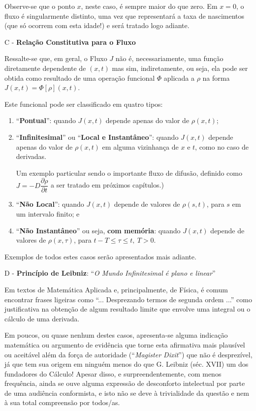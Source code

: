 {Observe-se que o ponto \(x\), neste caso, é sempre maior do que zero. Em \(x = 0\), o fluxo é singularmente distinto, uma vez que representará a taxa de nascimentos (que só ocorrem com esta idade!) e será tratado logo adiante.

C - \textbf{Relação Constitutiva para o Fluxo}

Ressalte-se que, em geral, o Fluxo \(J\) não é, necessariamente, uma função diretamente dependente de \((x,t)\) mas sim, indiretamente, ou seja, ela pode ser obtida como resultado de uma operação funcional \(\Phi\) aplicada a \(\rho\) na forma \(J(x,t) = \Phi[\rho](x,t)\).

Este funcional pode ser classificado em quatro tipos:

\begin{enumerate}
\item ``\textbf{Pontual}'': quando \(J(x,t)\) depende apenas do valor de \(\rho(x,t)\);
\item ``\textbf{Infinitesimal}'' ou ``\textbf{Local e Instantâneo}'': quando \(J(x,t)\) depende apenas do valor de \(\rho(x,t)\) em alguma vizinhança de \(x\) e \(t\), como no caso de derivadas.

Um exemplo particular sendo o importante fluxo de difusão, definido como \(J = -D \dfrac{\partial \rho}{\partial t}\) a ser tratado em próximos capítulos.)

\item ``\textbf{Não Local}'': quando \(J(x,t)\) depende de valores de \(\rho(s,t)\), para \(s\) em um intervalo finito; e
\item ``\textbf{Não Instantâneo}'' ou seja, \textbf{com memória}: quando \(J(x,t)\) depende de valores de \(\rho(x,\tau)\), para \(t - T \le \tau \le t,\ T > 0\).
\end{enumerate}


Exemplos de todos estes casos serão apresentados mais adiante.

D - \textbf{Princípio de Leibniz}: ``\textit{O Mundo Infinitesimal é plano e linear}''

Em textos de Matemática Aplicada e, principalmente, de Física, é comum encontrar frases ligeiras como ``... Desprezando termos de segunda ordem ...'' como justificativa na obtenção de algum resultado limite que envolve uma integral ou o cálculo de uma derivada.

Em poucos, ou quase nenhum destes casos, apresenta-se alguma indicação matemática ou argumento de evidência que torne esta afirmativa mais plausível ou aceitável além da força de autoridade (``\textit{Magister Dixit}'') que não é desprezível, já que tem sua origem em ninguém menos do que G. Leibniz (séc. XVII) um dos fundadores do Cálculo! Apesar disso, e surpreendentemente, com menos frequência, ainda se ouve alguma expressão de desconforto intelectual por parte de uma audiência conformista, e isto não se deve à trivialidade da questão e nem à sua total compreensão por todos/as.

}
